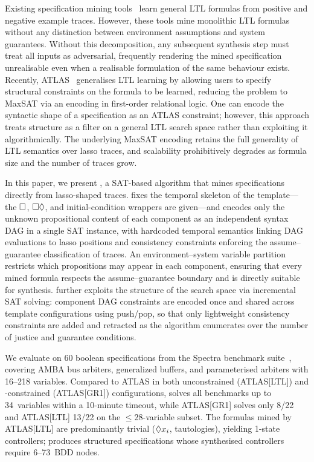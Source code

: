 Existing specification mining
tools~\cite{NeiderG18,LemieuxDB15,RahaRFV22} learn general LTL
formulas from positive and negative example traces.
However, these tools mine monolithic LTL formulas without any
distinction between environment assumptions and system guarantees.
Without this decomposition, any subsequent synthesis step must treat
all inputs as adversarial, frequently rendering the mined
specification unrealisable even when a realisable \GRone formulation
of the same behaviour exists.
Recently, ATLAS~\cite{ZhangCGD25} generalises LTL learning by
allowing users to specify structural constraints on the formula to
be learned, reducing the problem to MaxSAT via an encoding in
first-order relational logic.
One can encode the syntactic shape of a \GRone specification as an
ATLAS constraint; however, this approach treats \GRone structure as a
filter on a general LTL search space rather than exploiting it
algorithmically.
The underlying MaxSAT encoding retains the full generality of LTL
semantics over lasso traces, and scalability prohibitively degrades
as formula size and the number of traces grow.

In this paper, we present \toolname, a SAT-based algorithm that
mines \GRone specifications directly from lasso-shaped traces.
\toolname fixes the temporal skeleton of the \GRone template---the
$\square$, $\square\Diamond$, and initial-condition wrappers are
given---and encodes only the unknown propositional content of each
component as an independent syntax DAG in a single SAT instance,
with hardcoded temporal semantics linking DAG evaluations to lasso
positions and consistency constraints enforcing the
assume--guarantee classification of traces.
An environment--system variable partition restricts which
propositions may appear in each component, ensuring that every
mined formula respects the assume--guarantee boundary and is
directly suitable for synthesis.
\toolname further exploits the structure of the search space via
incremental SAT solving: component DAG constraints are encoded
once and shared across template configurations using push/pop,
so that only lightweight consistency constraints are added and
retracted as the algorithm enumerates over the number of justice
and guarantee conditions.

We evaluate \toolname on 60 boolean \GRone specifications from the
Spectra benchmark suite~\cite{MaozR21}, covering AMBA bus arbiters,
generalized buffers, and parameterised arbiters with 16--218
variables.
Compared to ATLAS in both unconstrained (ATLAS[LTL]) and
\GRone-constrained (ATLAS[GR1]) configurations, \toolname solves
all benchmarks up to 34~variables within a 10-minute timeout, while
ATLAS[GR1] solves only 8/22 and ATLAS[LTL] 13/22 on the
$\leq$28-variable subset.
The formulas mined by ATLAS[LTL] are predominantly trivial
($\Diamond x_i$, tautologies), yielding 1-state controllers;
\toolname produces structured \GRone specifications whose
synthesised controllers require 6--73~BDD nodes.

